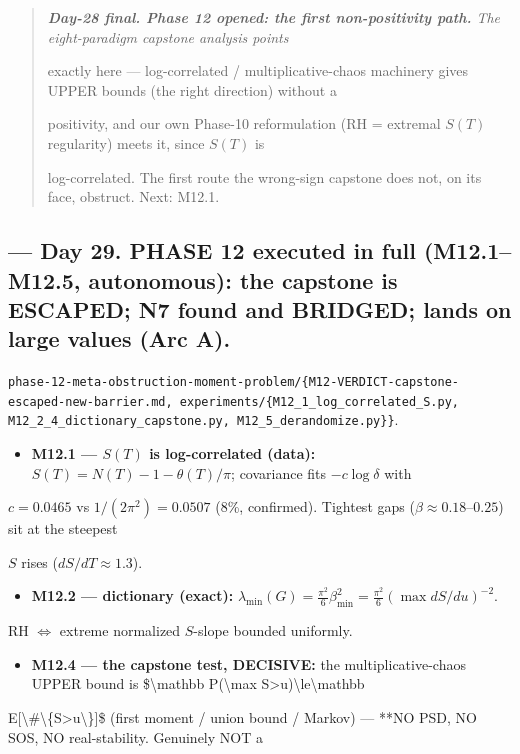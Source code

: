 \documentclass[10pt]{article}
\begin{document}
\begin{quote}\itshape
\textbf{Day-28 final. Phase 12 opened: the first non-positivity path.} The eight-paradigm capstone analysis points\par
exactly here --- log-correlated / multiplicative-chaos machinery gives UPPER bounds (the right direction) without a\par
positivity, and our own Phase-10 reformulation (RH = extremal $S(T)$ regularity) meets it, since $S(T)$ is\par
log-correlated. The first route the wrong-sign capstone does not, on its face, obstruct. Next: M12.1.\par
\end{quote}

\subsection*{ --- Day 29. PHASE 12 executed in full (M12.1--M12.5, autonomous): the capstone is ESCAPED; N7 found and BRIDGED; lands on large values (Arc A).}
\texttt{phase-12-meta-obstruction-moment-problem/\{M12-VERDICT-capstone-escaped-new-barrier.md, experiments/\{M12\_1\_log\_correlated\_S.py, M12\_2\_4\_dictionary\_capstone.py, M12\_5\_derandomize.py\}\}}.\par
\begin{itemize}
\item \textbf{M12.1 --- $S(T)$ is log-correlated (data):} $S(T)=N(T)-1-\theta(T)/\pi$; covariance fits $-c\log\delta$ with
\end{itemize}
  $c=0.0465$ vs $1/(2\pi^2)=0.0507$ (8\%, confirmed). Tightest gaps ($\beta\approx0.18$--$0.25$) sit at the steepest\par
  $S$ rises ($dS/dT\approx1.3$).\par
\begin{itemize}
\item \textbf{M12.2 --- dictionary (exact):} $\lambda_{\min}(G)=\frac{\pi^2}6\beta_{\min}^2=\frac{\pi^2}6(\max dS/du)^{-2}$.
\end{itemize}
  RH $\iff$ extreme normalized $S$-slope bounded uniformly.\par
\begin{itemize}
\item \textbf{M12.4 --- the capstone test, DECISIVE:} the multiplicative-chaos UPPER bound is \$\textbackslash{}mathbb P(\textbackslash{}max S>u)\textbackslash{}le\textbackslash{}mathbb
\end{itemize}
  E[\textbackslash{}\#\textbackslash{}\{S>u\textbackslash{}\}]\$ (first moment / union bound / Markov) --- **NO PSD, NO SOS, NO real-stability. Genuinely NOT a\par
\end{document}
